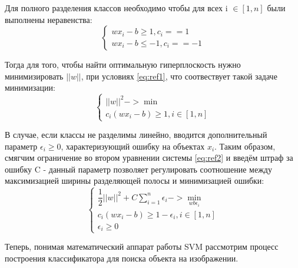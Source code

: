 Для полного разделения классов необходимо чтобы для всех i $\in [1, n]$ были выполнены неравенства:
\begin{equation}
\begin{cases}
wx_i - b \ge 1, c_i == 1 \\
wx_i - b \le -1, c_i == -1
\end{cases}
\label{eq:ref1}
\end{equation}

Тогда для того, чтобы найти оптимальную гиперплоскость нужно минимизировать $||w||$, при условиях \ref{eq:ref1}, что соотвествует такой задаче минимизации:
\begin{equation}
\begin{cases}
||w||^2 -> \min \\
c_i(wx_i - b) \ge 1, i \in [1, n]
\end{cases}
\label{eq:ref2}
\end{equation}

В случае, если классы не разделимы линейно, вводится дополнительный параметр $\epsilon_i \ge 0$, характеризующий ошибку на объектах $x_i$. Таким образом, смягчим ограничение во втором уравнении системы \ref{eq:ref2} и введём штраф за ошибку C - данный параметр позволяет регулировать соотношение между максимизацией ширины разделяющей полосы и минимизацией ошибки:
\begin{equation}
\begin{cases}
\dfrac{1}{2}||w||^2 + C\sum_{i=1}^{n}\epsilon_i -> \min_{wb\epsilon_i} \\
c_i(wx_i - b) \ge 1 - \epsilon_i, i \in [1, n] \\
\epsilon_i \ge 0
\end{cases}
\label{eq:ref3}
\end{equation}

Теперь, понимая математический аппарат работы SVM рассмотрим процесс построения классификатора для поиска объекта на изображении.

